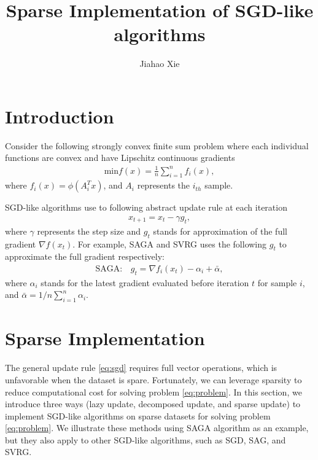 \documentclass{article}
\title{Sparse Implementation of SGD-like algorithms}
\author{Jiahao Xie}
\begin{document}
\maketitle

\section{Introduction}

Consider the following strongly convex finite sum problem where each individual functions are convex and have Lipschitz continuous gradients
\begin{equation} \label{eq:problem}
\begin{aligned}
    \mathrm{min} f(x) = \frac{1}{n} \sum_{i=1}^{n} f_i (x),
\end{aligned}
\end{equation}
where $f_i(x) = \phi(A_i^T x)$, and $A_i$ represents the $i_{th}$ sample.

SGD-like algorithms use to following abstract update rule at each iteration
\begin{equation} \label{eq:sgd}
\begin{aligned}
    x_{t+1} = x_{t} - \gamma g_{t},
\end{aligned}
\end{equation}
where $\gamma$ represents the step size and $g_{t}$ stands for approximation of the full gradient $\nabla f(x_t)$. For example, SAGA and SVRG uses the following $g_{t}$ to approximate the full gradient respectively:
\begin{equation} \label{eq:saga}
\begin{aligned}
    \mathrm{SAGA: } &g_{t} = \nabla f_i(x_t) - \alpha_i + \bar{\alpha},
\end{aligned}
\end{equation}
where $\alpha_i$ stands for the latest gradient evaluated before iteration $t$ for sample $i$, and $\bar{\alpha} = 1/n \sum_{i=1}^n \alpha_i$.

\section{Sparse Implementation}
The general update rule \eqref{eq:sgd} requires full vector operations, which is unfavorable when the dataset is spare. Fortunately, we can leverage sparsity to reduce computational cost for solving problem \eqref{eq:problem}. In this section, we introduce three ways (lazy update, decomposed update, and sparse update) to implement SGD-like algorithms on sparse datasets for solving problem \eqref{eq:problem}. We illustrate these methods using SAGA algorithm as an example, but they also apply to other SGD-like algorithms, such as SGD, SAG, and SVRG.
\end{document}
